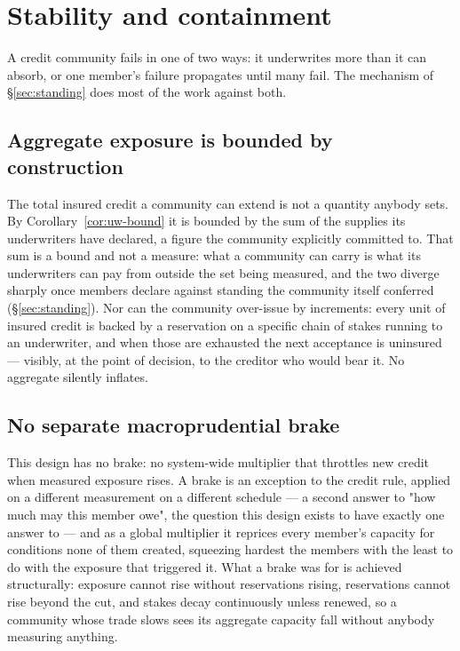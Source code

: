 \section{Stability and containment}
\label{sec:stability}

A credit community fails in one of two ways: it underwrites more than it can absorb, or
one member's failure propagates until many fail. The mechanism of \S\ref{sec:standing}
does most of the work against both.

\subsection{Aggregate exposure is bounded by construction}

The total insured credit a community can extend is not a quantity anybody sets. By
Corollary~\ref{cor:uw-bound} it is bounded by the sum of the supplies its underwriters
have declared, a figure the community explicitly committed to. That sum is a bound and
not a measure: what a community can carry is what its underwriters can pay from outside
the set being measured, and the two diverge sharply once members declare against standing
the community itself conferred (\S\ref{sec:standing}). Nor can the community over-issue
by increments: every unit of insured credit is backed by a reservation on a specific chain
of stakes running to an underwriter, and when those are exhausted the next acceptance is
uninsured --- visibly, at the point of decision, to the creditor who would bear it. No
aggregate silently inflates.

\subsection{No separate macroprudential brake}

This design has no brake: no system-wide multiplier that throttles new credit when
measured exposure rises. A brake is an exception to the credit rule, applied on a
different measurement on a different schedule --- a second answer to "how much may this
member owe", the question this design exists to have exactly one answer to --- and as a
global multiplier it reprices every member's capacity for conditions none of them created,
squeezing hardest the members with the least to do with the exposure that triggered it.
What a brake was for is achieved structurally: exposure cannot rise without reservations
rising, reservations cannot rise beyond the cut, and stakes decay continuously unless
renewed, so a community whose trade slows sees its aggregate capacity fall without anybody
measuring anything.

